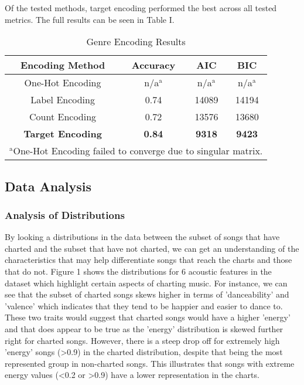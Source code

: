 \documentclass[conference]{IEEEtran}
\begin{document}
Of the tested methods, target encoding performed the best across all tested metrics. The full results can be seen in Table I.

\begin{table}[htbp]
\caption{Genre Encoding Results}
\begin{center}
\begin{tabular}{|c|c|c|c|}
\hline
\textbf{Encoding Method}&{\textbf{Accuracy}}&{\textbf{AIC}}&{\textbf{BIC}} \\
\hline
One-Hot Encoding & n/a$^{\mathrm{a}}$ & n/a$^{\mathrm{a}}$ & n/a$^{\mathrm{a}}$\\
Label Encoding & 0.74 & 14089 & 14194\\
Count Encoding & 0.72 & 13576 & 13680\\
\textbf{Target Encoding} & \textbf{0.84} & \textbf{9318} & \textbf{9423}\\
\hline
\multicolumn{4}{l}{$^{\mathrm{a}}$One-Hot Encoding failed to converge due to singular matrix.}
\end{tabular}
\label{tab1}
\end{center}
\end{table}

\subsection{Data Analysis}

\subsubsection{Analysis of Distributions}
By looking a distributions in the data between the subset of songs that have charted and the subset that have not charted, we can get an understanding of the characteristics that may help differentiate songs that reach the charts and those that do not. Figure 1 shows the distributions for 6 acoustic features in the dataset which highlight certain aspects of charting music. For instance, we can see that the subset of charted songs skews higher in terms of 'danceability' and 'valence'  which indicates that they tend to be happier and easier to dance to. These two traits would suggest that charted songs would have a higher 'energy' and that does appear to be true as the 'energy' distribution is skewed further right for charted songs. However, there is a steep drop off for extremely high 'energy' songs (\textgreater0.9) in the charted distribution, despite that being the most represented group in non-charted songs. This illustrates that songs with extreme energy values (\textless0.2 or \textgreater0.9) have a lower representation in the charts.
\end{document}
